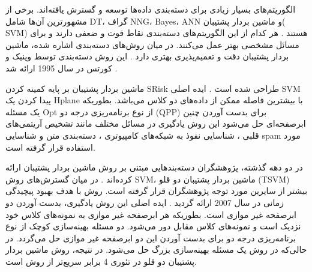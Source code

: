 الگوریتم‌های بسیار زیادی برای دسته‌بندی داده‌ها توسعه و گسترش یافته‌اند. برخی از مشهورترین آن‌ها شامل \gls{DT}، گراف  \gls{NNG}، \gls{Bayes}، \gls{ANN} و ماشین بردار پشتیبان( \gls{SVM}) هستند \cite{kotsiantis2007}. هر کدام از این الگوریتم‌های دسته‌بندی نقاط قوت و ضعفی دارند و برای مسائل مشخصی بهتر عمل می‌کنند. در میان روش‌های دسته‌بندی اشاره شده، ماشین بردار پشتیبان دقت و تعمیم‌پذیری بهتری دارد \cite{kotsiantis2007}. این روش دسته‌بندی توسط وپنیک و کورتس در سال 1995 ارائه شد \cite{vapnik1995}. 

ماشین بردار پشتیبان بر پایه کمینه کردن \gls{SRisk} طراحی شده است \cite{vapnik1998}. ایده اصلی \gls{SVM} پیدا کردن یک \gls{Hplane} با بیشترین فاصله ممکن از داده‌های دو کلاس می‌باشد. بطوریکه یک مسئله  \gls{Opt} از نوع برنامه‌ریزی درجه دو (\gls{QPP}) برای بدست آوردن چنین ابرصفحه‌ای حل می‌شود این روش یادگیری در مسائل مختلف مانند تشخیص آریتمی‌های قلبی \cite{nasiri2009}، شناسایی نفوذ به شبکه‌های کامپیوتری \cite{raman2017}، دسته‌بندی متن\cite{lee2012} و شناسایی \gls{spam} \cite{zoubi2018} مورد استفاده قرار گرفته است.

در دو دهه گذشته، پژوهشگران دسته‌بندهایی مبتنی بر روش ماشین بردار پشتیبان ارائه کرده‌اند \cite{nayak2015}. در میان گسترش‌های روش \gls*{SVM}، ماشین بردار پشتیبان دو قلو (\gls{TSVM}) بیشتر از سایرین مورد توجه پژوهشگران قرار گرفته است. روش  با هدف بهبود پیچیدگی زمانی   در سال 2007 ارائه گردید \cite{jayadeva2007}. ایده اصلی این روش یادگیری، بدست آوردن دو ابرصفحه غیر موازی است. بطوریکه هر ابرصفحه غیر موازی به نمونه‌های کلاس خود نزدیک است و نمونه‌های کلاس مقابل دور می‌شود. دو مسئله بهینه‌سازی کوچک از نوع برنامه‌ریزی درجه دو برای بدست آوردن این دو ابرصفحه غیر موازی حل می‌گردد. در حالی‌که در روش  یک مسئله بهینه‌سازی بزرگ حل می‌شود. در نتیجه، روش ماشین بردار پشتیبان دو قلو در تئوری 4 برابر سریع‌تر از روش  است.




